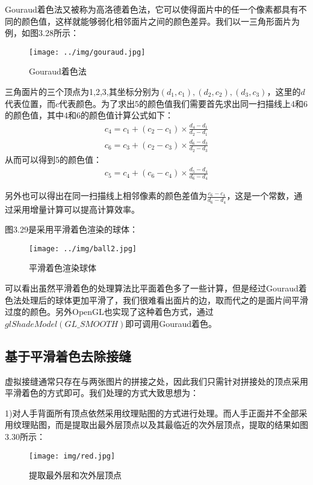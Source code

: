 Gouraud着色法又被称为高洛德着色法，它可以使得面片中的任一个像素都具有不同的颜色值，这样就能够弱化相邻面片之间的颜色差异。我们以一三角形面片为例，如图3.28所示：

\begin{figure}[htb]
\centering
\texttt{[image: ../img/gouraud.jpg]}
\caption{Gouraud着色法}
\label{fig：graph}
\end{figure} 
三角面片的三个顶点为1,2,3,其坐标分别为$(d_{1},c_{1}),(d_{2},c_{2}),(d_{3},c_{3})$，这里的$d$代表位置，而$c$代表颜色。为了求出5的颜色值我们需要首先求出同一扫描线上4和6的颜色值，其中4和6的颜色值计算公式如下：
\begin{eqnarray}
  c_{4}=c_{1}+(c_{2}-c_{1})\times \frac{d_{4}-d_{1}}{d_{2}-d_{1}}\\
  c_{6}=c_{3}+(c_{2}-c_{3})\times \frac{d_{6}-d_{3}}{d_{2}-d_{3}}
\end{eqnarray}
从而可以得到5的颜色值：
\begin{eqnarray}
  c_{5}=c_{4}+(c_{6}-c_{4})\times \frac{d_{5}-d_{4}}{d_{6}-d_{4}}
\end{eqnarray}

另外也可以得出在同一扫描线上相邻像素的颜色差值为$\frac{c_{6}-c_{4}}{d_{6}-d_{4}}$，这是一个常数，通过采用增量计算可以提高计算效率。

图3.29是采用平滑着色渲染的球体：

\begin{figure}[htb]
\centering
\texttt{[image: ../img/ball2.jpg]}
\caption{平滑着色渲染球体}
\label{fig：graph}
\end{figure} 
可以看出虽然平滑着色的处理算法比平面着色多了一些计算，但是经过Gouraud着色法处理后的球体更加平滑了，我们很难看出面片的边，取而代之的是面片间平滑过度的颜色。另外OpenGL也实现了这种着色方式，通过$glShadeModel(GL\_SMOOTH)$即可调用Gouraud着色。

\subsection{基于平滑着色去除接缝}
虚拟接缝通常只存在与两张图片的拼接之处，因此我们只需针对拼接处的顶点采用平滑着色的方式即可。我们处理的方式大致思想为：

1)对人手背面所有顶点依然采用纹理贴图的方式进行处理。而人手正面并不全部采用纹理贴图，而是提取出最外层顶点以及其最临近的次外层顶点，提取的结果如图3.30所示：

\begin{figure}[htb]
\centering
\texttt{[image: img/red.jpg]}
\caption{提取最外层和次外层顶点}
\label{fig：graph}
\end{figure}


